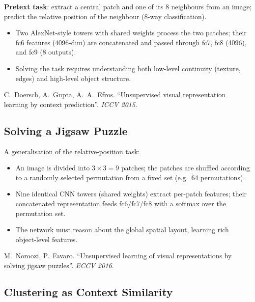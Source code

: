 \documentclass[11pt,a4paper]{article}
\theoremstyle{definition}
\theoremstyle{plain}
\theoremstyle{remark}
\begin{document}
\textbf{Pretext task}: extract a central patch and one of its 8 neighbours from an image; predict the relative position of the neighbour (8-way classification).

\begin{itemize}
    \item Two AlexNet-style towers with shared weights process the two patches; their fc6 features (4096-dim) are concatenated and passed through fc7, fc8 (4096), and fc9 (8 outputs).
    \item Solving the task requires understanding both low-level continuity (texture, edges) and high-level object structure.
\end{itemize}

\begin{tcolorbox}[colback=blue!5!white,colframe=blue!60!black,title={Reference}]
C.\ Doersch, A.\ Gupta, A.\ A.\ Efros. ``Unsupervised visual representation learning by context prediction''. \textit{ICCV 2015}.
\end{tcolorbox}

\subsection{Solving a Jigsaw Puzzle}

A generalisation of the relative-position task:

\begin{itemize}
    \item An image is divided into $3 \times 3 = 9$ patches; the patches are shuffled according to a randomly selected permutation from a fixed set (e.g.\ 64 permutations).
    \item Nine identical CNN towers (shared weights) extract per-patch features; their concatenated representation feeds fc6/fc7/fc8 with a softmax over the permutation set.
    \item The network must reason about the global spatial layout, learning rich object-level features.
\end{itemize}

\begin{tcolorbox}[colback=blue!5!white,colframe=blue!60!black,title={Reference}]
M.\ Noroozi, P.\ Favaro. ``Unsupervised learning of visual representations by solving jigsaw puzzles''. \textit{ECCV 2016}.
\end{tcolorbox}

\subsection{Clustering as Context Similarity}
\end{document}

